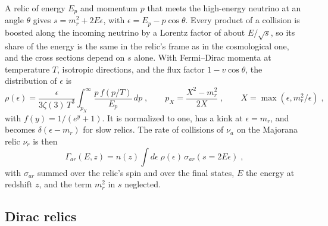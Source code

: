 \documentclass[11pt]{article}
\begin{document}
A relic of energy $E_p$ and momentum $p$ that meets the high-energy neutrino at an angle $\theta$ gives $s = m_r^2 + 2E\epsilon$, with $\epsilon = E_p - p\cos\theta$.
Every product of a collision is boosted along the incoming neutrino by a Lorentz factor of about $E/\sqrt{s}$, so its share of the energy is the same in the relic's frame as in the cosmological one, and the cross sections depend on $s$ alone.
With Fermi--Dirac momenta at temperature $T$, isotropic directions, and the flux factor $1 - v\cos\theta$, the distribution of $\epsilon$ is
\begin{equation}
 \rho(\epsilon) = \frac{\epsilon}{3\zeta(3)\, T^3} \int_{p_X}^\infty \frac{p\, f(p/T)}{E_p}\, dp \;, \qquad
 p_X = \frac{X^2 - m_r^2}{2X} \;, \qquad X = \max(\epsilon, m_r^2/\epsilon) \;,
\end{equation}
with $f(y) = 1/(e^y + 1)$.
It is normalized to one, has a kink at $\epsilon = m_r$, and becomes $\delta(\epsilon - m_r)$ for slow relics.
The rate of collisions of $\nu_a$ on the Majorana relic $\nu_r$ is then
\begin{equation}
 \label{equ:rate}
 \Gamma_{ar}(E, z) = n(z) \int d\epsilon\; \rho(\epsilon)\, \sigma_{ar}(s = 2E\epsilon) \;,
\end{equation}
with $\sigma_{ar}$ summed over the relic's spin and over the final states, $E$ the energy at redshift $z$, and the term $m_r^2$ in $s$ neglected.

\subsection*{Dirac relics}
\end{document}
